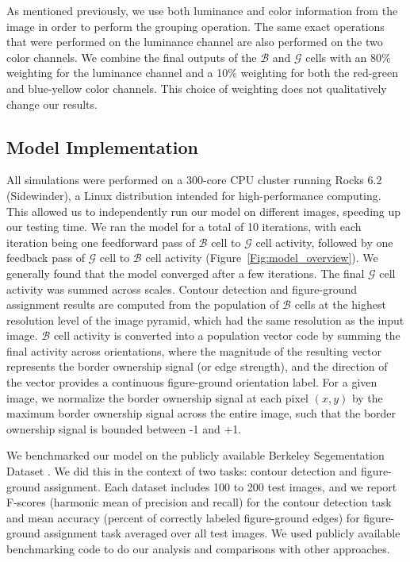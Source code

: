 As mentioned previously, we use both luminance and color information from the image in order to perform the grouping operation. The same exact operations that were performed on the luminance channel are also performed on the two color channels. We combine the final outputs of the $\mathcal{B}$ and $\mathcal{G}$ cells with an 80\% weighting for the luminance channel and a 10\% weighting for both the red-green and blue-yellow color channels. This choice of weighting does not qualitatively change our results.

\subsection{Model Implementation}
\label{sec:implementation}

All simulations were performed on a 
300-core CPU cluster running Rocks 6.2 (Sidewinder), a Linux
distribution intended for high-performance computing. This allowed us to independently
run our model on different images, speeding up our testing time. We ran the model for a total of 10 iterations, with each iteration being one feedforward pass of $\mathcal{B}$ cell to $\mathcal{G}$ cell activity, followed by one feedback pass of $\mathcal{G}$ cell to $\mathcal{B}$ cell activity (Figure~\ref{Fig:model_overview}). We generally found that the model converged after a few iterations. The final $\mathcal{G}$ cell activity was summed across scales. Contour detection and figure-ground assignment results are computed from the population of $\mathcal{B}$ cells at the highest resolution level of the image pyramid, which had the same resolution as the input image. $\mathcal{B}$ cell activity is converted into a population vector code by summing the final activity across orientations, where the magnitude of the resulting vector represents the border ownership signal (or edge strength), and the direction of the vector provides a continuous figure-ground orientation label. For a given image, we normalize the border ownership signal at each pixel $(x,y)$ by the maximum border ownership signal across the entire image, such that the border ownership signal is bounded between -1 and +1.

We benchmarked our model on the publicly available Berkeley Segementation Dataset \citep{Martin_etal01}. We did this in the context of two tasks: contour detection and figure-ground assignment. Each dataset includes 100 to 200 test images, and we report F-scores (harmonic mean of precision and recall) for the contour detection task and mean accuracy (percent of correctly labeled figure-ground edges) for figure-ground assignment task averaged over all test images. We used publicly available benchmarking code to do our analysis and comparisons with other approaches.

